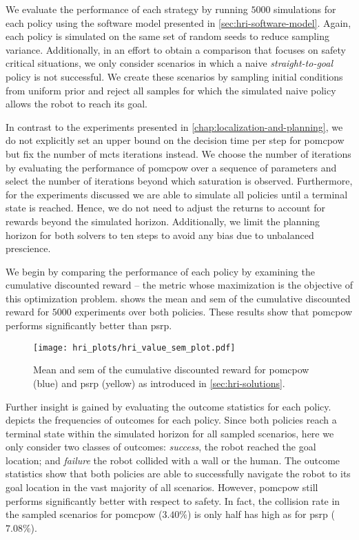 We evaluate the performance of each strategy by running $5000$ simulations for
each policy using the software model presented in
\cref{sec:hri-software-model}. Again, each policy is simulated on the same set
of random seeds to reduce sampling variance. Additionally, in an effort to
obtain a comparison that focuses on safety critical situations, we only
consider scenarios in which a naive \emph{straight-to-goal} policy is not
successful. We create these scenarios by sampling initial conditions from
uniform prior and reject all samples for which the simulated naive policy
allows the robot to reach its goal.

In contrast to the experiments presented in
\cref{chap:localization-and-planning}, we do not explicitly set an upper bound
on the decision time per step for \ac{pomcpow} but fix the number of
\ac{mcts} iterations instead. We choose the number of iterations by evaluating the
performance of \ac{pomcpow} over a sequence of parameters and select the number
of iterations beyond which saturation is observed. Furthermore, for the
experiments discussed we are able to simulate all policies until a terminal
state is reached. Hence, we do not need to adjust the returns to account for
rewards beyond the simulated horizon. Additionally, we limit the planning horizon
for both solvers to ten steps to avoid any bias due to unbalanced prescience.

We begin by comparing the performance of each policy by examining the
cumulative discounted reward -- the metric whose maximization is the objective
of this optimization problem.  shows the mean and
\ac{sem} of the cumulative discounted reward for $5000$ experiments over both
policies. These results show that \ac{pomcpow} performs significantly better
than \ac{psrp}.

\begin{figure}[htpb]
  \centering
  \texttt{[image: hri\_plots/hri\_value\_sem\_plot.pdf]}
  \caption{Mean and \acf{sem} of the cumulative discounted reward for
  \ac{pomcpow} (blue) and \ac{psrp} (yellow) as introduced in \cref{sec:hri-solutions}.}
  \label{fig:hri_eval_value_sem}
\end{figure}

Further insight is gained by evaluating the outcome statistics for each policy.
 depicts the frequencies of outcomes for each
policy. Since both policies reach a terminal state within the simulated horizon
for all sampled scenarios, here we only consider two classes of outcomes:
\emph{success}, the robot reached the goal location; and \emph{failure} the
robot collided with a wall or the human. The outcome statistics show that both
policies are able to successfully navigate the robot to its goal location in
the vast majority of all scenarios. However, \ac{pomcpow} still performs
significantly better with respect to safety. In fact, the collision rate in the
sampled scenarios for \ac{pomcpow} ($3.40\%$) is only half has high as for
\ac{psrp} ($7.08\%$).

